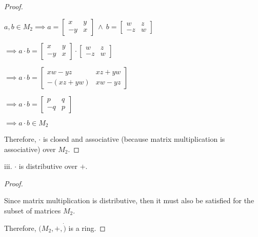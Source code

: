 \documentclass{article}
\begin{document}
\begin{proof}
  $ $

  $a, b \in M_2 \implies a = \begin{bmatrix}
    x & y \\
    -y & x
  \end{bmatrix}
  \ \land \ 
  b= \begin{bmatrix}
    w & z \\
    -z & w
  \end{bmatrix}$
  \newline
  
  $\implies a \cdot b
  =
  \begin{bmatrix}
    x & y \\
    -y & x
  \end{bmatrix}
  \cdot
  \begin{bmatrix}
    w & z \\
    -z & w
  \end{bmatrix}
  $
  \newline

  $\implies a \cdot b
  =
  \begin{bmatrix}
    xw - yz & xz +yw \\
    -(xz+yw) & xw -yz
  \end{bmatrix}
  $
  \newline

  $\implies a \cdot b
  =
  \begin{bmatrix}
    p & q \\
    -q & p
  \end{bmatrix}
  $
  \newline

  $\implies a \cdot b \in M_2$
  \newline

  Therefore, $\cdot$ is closed and associative (because matrix multiplication is associative) over $M_2$.
  
\end{proof}

\noindent
iii. $\cdot$ is distributive over $+$.

\begin{proof}
  $ $

  Since matrix multiplication is distributive, then it must also be satisfied for the subset of matrices $M_2$.
  \newline
  
  \noindent
  Therefore, $(M_2, +, \dot)$ is a ring.
\end{proof}
\end{document}
